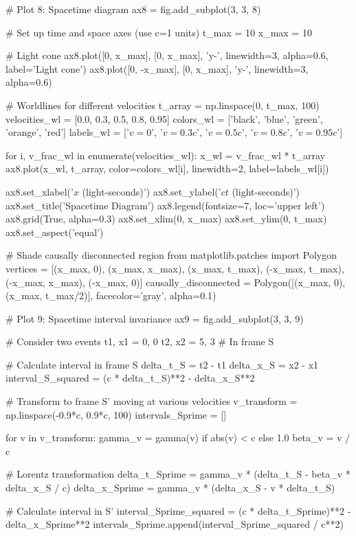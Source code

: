 \documentclass[a4paper, 11pt]{article}
\begin{document}
\begin{pycode}
# Plot 8: Spacetime diagram
ax8 = fig.add_subplot(3, 3, 8)

# Set up time and space axes (use c=1 units)
t_max = 10
x_max = 10

# Light cone
ax8.plot([0, x_max], [0, x_max], 'y-', linewidth=3, alpha=0.6, label='Light cone')
ax8.plot([0, -x_max], [0, x_max], 'y-', linewidth=3, alpha=0.6)

# Worldlines for different velocities
t_array = np.linspace(0, t_max, 100)
velocities_wl = [0.0, 0.3, 0.5, 0.8, 0.95]
colors_wl = ['black', 'blue', 'green', 'orange', 'red']
labels_wl = ['$v=0$', '$v=0.3c$', '$v=0.5c$', '$v=0.8c$', '$v=0.95c$']

for i, v_frac_wl in enumerate(velocities_wl):
    x_wl = v_frac_wl * t_array
    ax8.plot(x_wl, t_array, color=colors_wl[i], linewidth=2, label=labels_wl[i])

ax8.set_xlabel('$x$ (light-seconds)')
ax8.set_ylabel('$ct$ (light-seconds)')
ax8.set_title('Spacetime Diagram')
ax8.legend(fontsize=7, loc='upper left')
ax8.grid(True, alpha=0.3)
ax8.set_xlim(0, x_max)
ax8.set_ylim(0, t_max)
ax8.set_aspect('equal')

# Shade causally disconnected region
from matplotlib.patches import Polygon
vertices = [(x_max, 0), (x_max, x_max), (x_max, t_max), (-x_max, t_max),
            (-x_max, x_max), (-x_max, 0)]
causally_disconnected = Polygon([(x_max, 0), (x_max, t_max/2)],
                                 facecolor='gray', alpha=0.1)

# Plot 9: Spacetime interval invariance
ax9 = fig.add_subplot(3, 3, 9)

# Consider two events
t1, x1 = 0, 0
t2, x2 = 5, 3  # In frame S

# Calculate interval in frame S
delta_t_S = t2 - t1
delta_x_S = x2 - x1
interval_S_squared = (c * delta_t_S)**2 - delta_x_S**2

# Transform to frame S' moving at various velocities
v_transform = np.linspace(-0.9*c, 0.9*c, 100)
intervals_Sprime = []

for v in v_transform:
    gamma_v = gamma(v) if abs(v) < c else 1.0
    beta_v = v / c

    # Lorentz transformation
    delta_t_Sprime = gamma_v * (delta_t_S - beta_v * delta_x_S / c)
    delta_x_Sprime = gamma_v * (delta_x_S - v * delta_t_S)

    # Calculate interval in S'
    interval_Sprime_squared = (c * delta_t_Sprime)**2 - delta_x_Sprime**2
    intervals_Sprime.append(interval_Sprime_squared / c**2)


\end{pycode}
\end{document}

